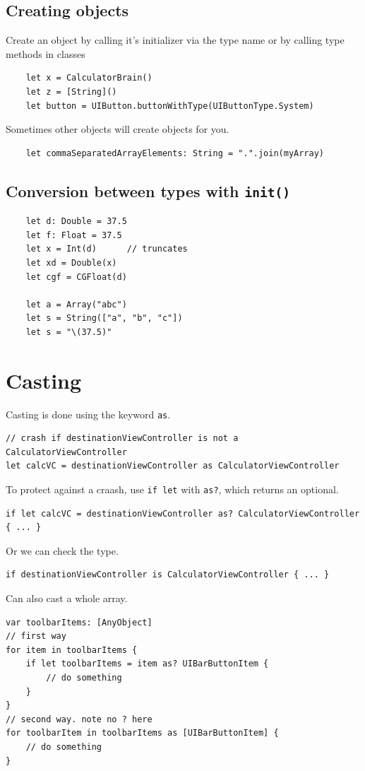 \documentclass[12pt]{report}
\newcommand{\co}{\texttt}
\begin{document}
\subsection{Creating objects}
Create an object by calling it's initializer via the type name or by calling type methods in classes
\begin{lstlisting}
	let x = CalculatorBrain()
	let z = [String]()
	let button = UIButton.buttonWithType(UIButtonType.System)
\end{lstlisting}
Sometimes other objects will create objects for you.
\begin{lstlisting}
	let commaSeparatedArrayElements: String = ".".join(myArray)
\end{lstlisting}

\subsection{Conversion between types with \co{init()}}
\begin{lstlisting}
	let d: Double = 37.5
	let f: Float = 37.5
	let x = Int(d)		// truncates
	let xd = Double(x)
	let cgf = CGFloat(d)

	let a = Array("abc")
	let s = String(["a", "b", "c"])
	let s = "\(37.5)"
\end{lstlisting}


\section{Casting}
Casting is done using the keyword \co{as}.
\begin{lstlisting}
// crash if destinationViewController is not a CalculatorViewController
let calcVC = destinationViewController as CalculatorViewController
\end{lstlisting}

To protect against a craash, use \co{if let} with \co{as?}, which returns an optional.
\begin{lstlisting}
if let calcVC = destinationViewController as? CalculatorViewController { ... }
\end{lstlisting}

Or we can check the type.
\begin{lstlisting}
if destinationViewController is CalculatorViewController { ... }
\end{lstlisting}

Can also cast a whole array.
\begin{lstlisting}
var toolbarItems: [AnyObject]
// first way
for item in toolbarItems {
	if let toolbarItems = item as? UIBarButtonItem {
		// do something
	}
}
// second way. note no ? here
for toolbarItem in toolbarItems as [UIBarButtonItem] { 
	// do something
}
\end{lstlisting}
\end{document}
